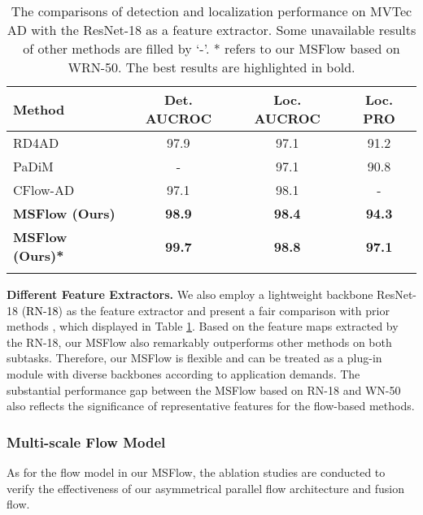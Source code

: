 \documentclass[lettersize,journal]{IEEEtran}
\newcommand{\myrule}{\specialrule{.1em}{.0ex}{.0ex}}
\newcommand{\rounda}[1]{\textcolor{black}{#1}}
\begin{document}
\begin{table}[!htb]
  \centering
  \caption{The comparisons of detection and localization performance on MVTec AD with the ResNet-18 as a feature extractor. Some unavailable results of other methods \cite{defard2021padim,gudovskiy2022cflow} are filled by `-'. * refers to our MSFlow based on WRN-50. The best results are highlighted in bold.} \label{tab:as-resnet18}
  \begin{tabular}{l|c|c|c}
  \myrule
  Method                                & Det. AUCROC                  & Loc. AUCROC         & Loc. PRO                             \\ \hline
  RD4AD  \cite{deng2022distillation}    & 97.9                        & 97.1               & 91.2                                 \\ 
  PaDiM  \cite{defard2021padim}        & -                           & 97.1               & 90.8                                 \\ 
  CFlow-AD  \cite{gudovskiy2022cflow}    & 97.1                        & 98.1               & -                                    \\ \hline
  \textbf{MSFlow (Ours)}                    & \textbf{98.9}               & \textbf{98.4}      & \textbf{94.3}                        \\ \hline\hline
  \textbf{MSFlow (Ours)*}               & \textbf{99.7}                & \textbf{98.8}        &  \textbf{97.1} \\ \myrule
\end{tabular}
  \end{table}

\vspace{3pt}\textbf{Different Feature Extractors.}
We also employ a lightweight backbone ResNet-18 (\rounda{RN-18}) \cite{he2016resnet} as the feature extractor and present a fair comparison with prior methods \cite{deng2022distillation,defard2021padim,gudovskiy2022cflow}, which displayed in Table \ref{tab:as-resnet18}. Based on the feature maps extracted by the RN-18, our MSFlow also remarkably outperforms other methods on both subtasks. Therefore, our MSFlow is flexible and can be treated as a plug-in module with diverse backbones according to application demands. The substantial performance gap between the MSFlow based on RN-18 and WN-50 also reflects the significance of representative features for the flow-based methods.


\subsubsection{Multi-scale Flow Model}
As for the flow model in our MSFlow, the ablation studies are conducted to verify the effectiveness of our asymmetrical parallel flow architecture and fusion flow.
\end{document}
